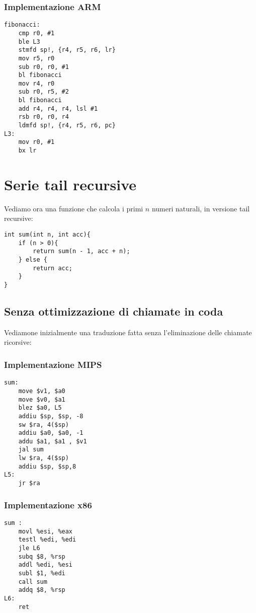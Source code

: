 \documentclass[class=book, crop=false, oneside]{standalone}
\begin{document}
\subsubsection{Implementazione ARM}

\begin{verbatim}
fibonacci:
	cmp r0, #1
	ble L3
	stmfd sp!, {r4, r5, r6, lr}
	mov r5, r0
	sub r0, r0, #1
	bl fibonacci
	mov r4, r0
	sub r0, r5, #2
	bl fibonacci
	add r4, r4, r4, lsl #1
	rsb r0, r0, r4
	ldmfd sp!, {r4, r5, r6, pc}
L3:
	mov r0, #1
	bx lr
\end{verbatim}

\section{Serie tail recursive}
Vediamo ora una funzione che calcola i primi \(n\) numeri naturali, in versione tail recursive:
\begin{verbatim}
int sum(int n, int acc){
	if (n > 0){
		return sum(n - 1, acc + n);
	} else {
		return acc;
	}
}
\end{verbatim}

\subsection*{Senza ottimizzazione di chiamate in coda}
Vediamone inizialmente una traduzione fatta senza l'eliminazione delle chiamate ricorsive:
\subsubsection{Implementazione MIPS}

\begin{verbatim}
sum:
	move $v1, $a0
	move $v0, $a1
	blez $a0, L5
	addiu $sp, $sp, -8
	sw $ra, 4($sp)
	addiu $a0, $a0, -1
	addu $a1, $a1 , $v1
	jal sum
	lw $ra, 4($sp)
	addiu $sp, $sp,8
L5:
	jr $ra
\end{verbatim}

\subsubsection{Implementazione x86}

\begin{verbatim}
sum :
	movl %esi, %eax
	testl %edi, %edi
	jle L6
	subq $8, %rsp
	addl %edi, %esi
	subl $1, %edi
	call sum
	addq $8, %rsp
L6:
	ret
\end{verbatim}
\end{document}
